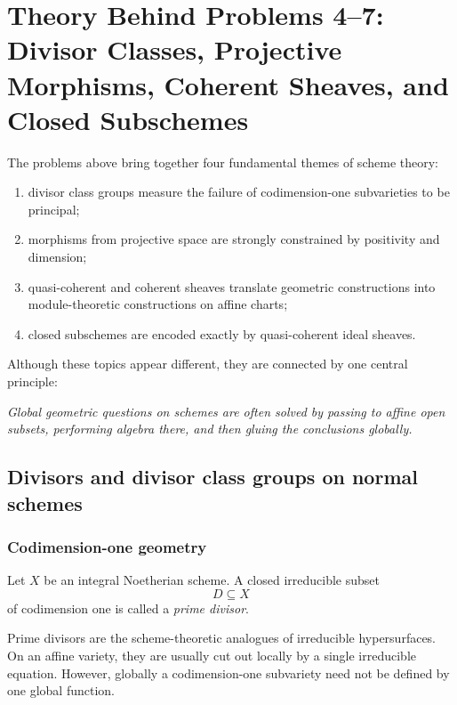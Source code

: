 \documentclass[12pt,a4paper]{article}
\theoremstyle{notespace}
\begin{document}
\section{Theory Behind Problems 4--7:
	Divisor Classes, Projective Morphisms, Coherent Sheaves, and Closed Subschemes}

The problems above bring together four fundamental themes of scheme theory:

\begin{enumerate}[label=\arabic*.]
	\item divisor class groups measure the failure of codimension-one subvarieties to be principal;
	\item morphisms from projective space are strongly constrained by positivity and dimension;
	\item quasi-coherent and coherent sheaves translate geometric constructions into module-theoretic constructions on affine charts;
	\item closed subschemes are encoded exactly by quasi-coherent ideal sheaves.
\end{enumerate}

Although these topics appear different, they are connected by one central principle:

\begin{center}
	\emph{Global geometric questions on schemes are often solved by passing to affine open subsets, performing algebra there, and then gluing the conclusions globally.}
\end{center}

\subsection{Divisors and divisor class groups on normal schemes}

\subsubsection{Codimension-one geometry}

Let \(X\) be an integral Noetherian scheme. A closed irreducible subset
\[
D\subseteq X
\]
of codimension one is called a \emph{prime divisor}.

Prime divisors are the scheme-theoretic analogues of irreducible hypersurfaces. On an affine variety, they are usually cut out locally by a single irreducible equation. However, globally a codimension-one subvariety need not be defined by one global function.
\end{document}
